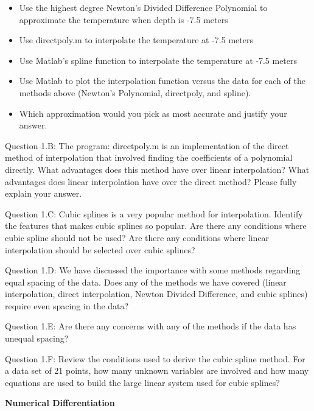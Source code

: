 \documentclass{article}
\begin{document}
\begin{itemize}
\item Use the highest degree Newton's Divided Difference Polynomial to approximate the temperature when depth is  -7.5 meters
\item Use directpoly.m to interpolate the temperature at -7.5 meters
\item Use Matlab's spline function to interpolate the temperature at -7.5 meters
\item Use Matlab to plot the interpolation function versus the data for each of the methods above (Newton's Polynomial, directpoly, and spline). 
\item Which approximation would you pick as most accurate and justify your answer. 
\end{itemize}
\medskip \par \noindent
%
Question 1.B: The program: directpoly.m is an implementation of the direct method of interpolation that involved finding the coefficients of a polynomial directly. What advantages does this method have over linear interpolation? What advantages does linear interpolation have over the direct method? Please fully explain your answer. 
\medskip \par \noindent
%
Question 1.C: Cubic splines is a very popular method for interpolation. Identify the features that makes cubic splines so popular. Are there any conditions where cubic spline should not be used? Are there any conditions where linear interpolation should be selected over cubic splines? 

\medskip \par \noindent
%
Question 1.D: We have discussed the importance with some methods regarding equal spacing of the data. Does any of the methods we have covered (linear interpolation, direct interpolation, Newton Divided Difference, and cubic splines) require even spacing in the data? 
\medskip \par \noindent
%
Question 1.E: Are there any concerns with any of the methods if the data has unequal spacing?
%
\medskip \par \noindent
Question 1.F: Review the conditions used to derive the cubic spline method. For a data set of 21 points, how many unknown variables are involved and how many equations are used to build the large linear system used for cubic splines?
\par \bigskip \par
{\bf Numerical Differentiation } \\
\end{document}
